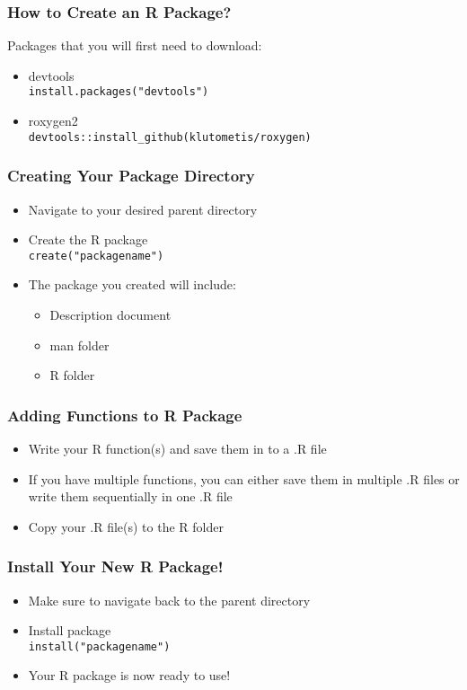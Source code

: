 \documentclass{beamer}
\begin{document}
\begin{frame}
\frametitle{How to Create an R Package?}
Packages that you will first need to download:
\begin{itemize}
    \item devtools \\
        \texttt{install.packages("devtools")}
    \item roxygen2 \\
        \texttt{devtools::install\_github(klutometis/roxygen)}
\end{itemize}
\end{frame}

\begin{frame}
\frametitle{Creating Your Package Directory}
\begin{itemize}
    \item Navigate to your desired parent directory
    \item Create the R package \\
        \texttt{create("packagename")}
    \item The package you created will include:
    \begin{itemize}
        \item Description document
        \item man folder
        \item R folder
    \end{itemize}
\end{itemize}
\end{frame}

\begin{frame}
\frametitle{Adding Functions to R Package}
\begin{itemize}
    \item Write your R function(s) and save them in to a .R file
    \item If you have multiple functions, you can either save them in multiple .R files or write them sequentially in one .R file
    \item Copy your .R file(s) to the R folder
\end{itemize}
\end{frame}

\begin{frame}
\frametitle{Install Your New R Package!}
\begin{itemize}
    \item Make sure to navigate back to the parent directory
    \item Install package \\ 
        \texttt{install("packagename")}
    \item Your R package is now ready to use!
\end{itemize}
\end{frame}
\end{document}
